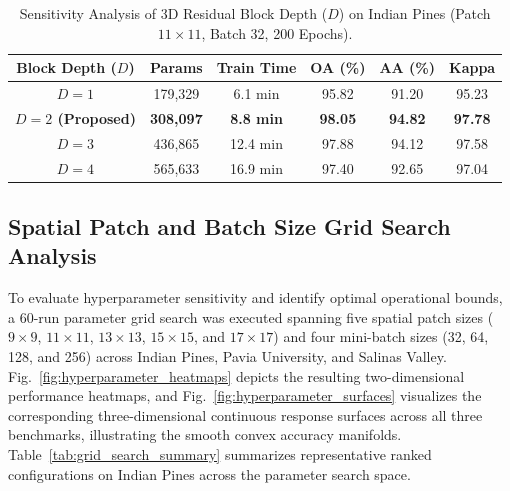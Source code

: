 \documentclass[manuscript,screen,review]{acmart}
\begin{document}
\begin{table}[t]
\centering
\footnotesize
\caption{Sensitivity Analysis of 3D Residual Block Depth ($D$) on Indian Pines (Patch $11 \times 11$, Batch 32, 200 Epochs).}
\label{tab:depth_ablation}
\begin{tabular}{cccccc}
\toprule
\textbf{Block Depth ($D$)} & \textbf{Params} & \textbf{Train Time} & \textbf{OA (\%)} & \textbf{AA (\%)} & \textbf{Kappa} \\
\midrule
$D = 1$ & 179,329 & 6.1 min & 95.82 & 91.20 & 95.23 \\
\textbf{$D = 2$ (Proposed)} & \textbf{308,097} & \textbf{8.8 min} & \textbf{98.05} & \textbf{94.82} & \textbf{97.78} \\
$D = 3$ & 436,865 & 12.4 min & 97.88 & 94.12 & 97.58 \\
$D = 4$ & 565,633 & 16.9 min & 97.40 & 92.65 & 97.04 \\
\bottomrule
\end{tabular}
\end{table}

\subsection{Spatial Patch and Batch Size Grid Search Analysis}
\label{subsec:grid_search}
To evaluate hyperparameter sensitivity and identify optimal operational bounds, a 60-run parameter grid search was executed spanning five spatial patch sizes ($9 \times 9$, $11 \times 11$, $13 \times 13$, $15 \times 15$, and $17 \times 17$) and four mini-batch sizes (32, 64, 128, and 256) across Indian Pines, Pavia University, and Salinas Valley. Fig.~\ref{fig:hyperparameter_heatmaps} depicts the resulting two-dimensional performance heatmaps, and Fig.~\ref{fig:hyperparameter_surfaces} visualizes the corresponding three-dimensional continuous response surfaces across all three benchmarks, illustrating the smooth convex accuracy manifolds. Table~\ref{tab:grid_search_summary} summarizes representative ranked configurations on Indian Pines across the parameter search space.
\end{document}
